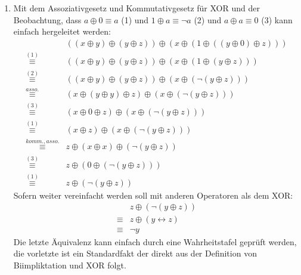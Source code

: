 \documentclass[a4paper,10pt]{article}
\begin{document}
\begin{enumerate}
\item Mit dem Assoziativgesetz und Kommutativgesetz für XOR und der Beobachtung, dass $a \oplus 0 \equiv a$ (1) und $1 \oplus a \equiv \neg a$ (2) und $a \oplus a \equiv 0$ (3) kann einfach hergeleitet werden:
\begin{align*}
& ((x \oplus y) \oplus (y \oplus z)) \oplus (x \oplus (1 \oplus ((y \oplus 0) \oplus z))) \\
\stackrel{(1)}{\equiv} & ((x \oplus y) \oplus (y \oplus z)) \oplus (x \oplus (1 \oplus (y \oplus z))) \\
\stackrel{(2)}{\equiv} & ((x \oplus y) \oplus (y \oplus z)) \oplus (x \oplus (\neg(y \oplus z))) \\
\stackrel{asso.}{\equiv} & (x \oplus (y \oplus y) \oplus z) \oplus (x \oplus (\neg(y \oplus z))) \\
\stackrel{(3)}{\equiv} & (x \oplus 0 \oplus z) \oplus (x \oplus (\neg(y \oplus z))) \\
\stackrel{(1)}{\equiv} & (x \oplus z) \oplus (x \oplus (\neg(y \oplus z))) \\
\stackrel{komm., asso.}{\equiv} & z \oplus (x \oplus x) \oplus (\neg(y \oplus z)) \\
\stackrel{(3)}{\equiv} & z \oplus (0 \oplus (\neg(y \oplus z))) \\
\stackrel{(1)}{\equiv} & z \oplus (\neg(y \oplus z)) 
\end{align*}
Sofern weiter vereinfacht werden soll mit anderen Operatoren als dem XOR:
\begin{align*}
& z \oplus (\neg(y \oplus z)) \\
\equiv & z \oplus (y \leftrightarrow z) \\
\equiv & \neg y 
\end{align*}
Die letzte Äquivalenz kann einfach durch eine Wahrheitstafel geprüft werden, die vorletzte ist ein Standardfakt der direkt aus der Definition von Biimpliktation und XOR folgt.
\end{enumerate}
\end{document}
